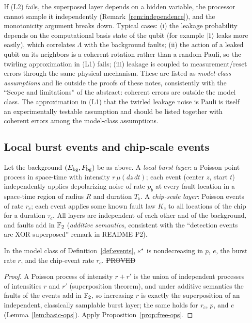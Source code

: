 \begin{remark}\label{rem:L-fail}
If (L2) fails, the superposed layer depends on a hidden variable, the processor cannot sample it independently (Remark~\ref{rem:independence}), and the monotonicity argument breaks down. Typical cases:
(i) the leakage probability depends on the computational basis state of the qubit (for example $\lvert1\rangle$ leaks more easily), which correlates $\Lambda$ with the background faults;
(ii) the action of a leaked qubit on its neighbors is a coherent rotation rather than a random Pauli, so the twirling approximation in (L1) fails;
(iii) leakage is coupled to measurement/reset errors through the same physical mechanism. These are listed as \emph{model-class assumptions} and lie outside the proofs of these notes,
consistently with the ``Scope and limitations'' of the abstract: coherent errors are outside the model class.
The approximation in (L1) that the twirled leakage noise is Pauli is itself an experimentally testable assumption and should be listed together with coherent errors among the model-class assumptions.
\end{remark}

\subsection{Local burst events and chip-scale events}

\begin{definition}\label{def:events}
Let the background $(E_{\rm bg},F_{\rm bg})$ be as above. A \emph{local burst layer}: a Poisson point process in space-time with intensity $r\,\mu(dz\,dt)$;
each event (center $z$, start $t$) independently applies depolarizing noise of rate $p_b$ at every fault location in a space-time region of radius $R$ and duration $T_b$.
A \emph{chip-scale layer}: Poisson events of rate $r_c$; each event applies some known fault law $K_c$ to all locations of the chip for a duration $\tau_c$.
All layers are independent of each other and of the background, and faults add in $\mathbb{F}_2$ (\emph{additive semantics}, consistent with the ``detection events are XOR-superposed'' remark in README P2).
\end{definition}

\begin{proposition}\label{prop:rate-mono}
In the model class of Definition~\ref{def:events}, $\varepsilon^{\star}$ is nondecreasing in $p$, $e$, the burst rate $r$, and the chip-event rate $r_c$.
\hfill\st{PROVED}
\end{proposition}
\begin{proof}
A Poisson process of intensity $r+r'$ is the union of independent processes of intensities $r$ and $r'$ (superposition theorem), and under additive semantics the faults of the events add in $\mathbb{F}_2$,
so increasing $r$ is exactly the superposition of an independent, classically samplable burst layer; the same holds for $r_c$, $p$, and $e$ (Lemma~\ref{lem:basic-ops}).
Apply Proposition~\ref{prop:free-ops}.
\end{proof}

